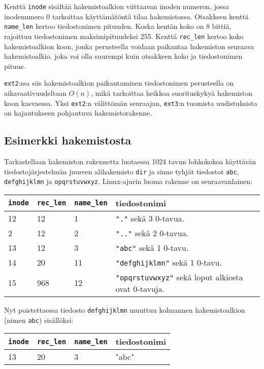 Kenttä \texttt{inode} sisältää hakemistoalkion viittaavan inoden numeron,
jossa inodenumero 0 tarkoittaa käyttämätöntä tilaa hakemistossa.
Otsakkeen kenttä \texttt{name\_len} kertoo tiedostonimen pituuden.
Koska kentän koko on 8 bittiä, rajoittuu tiedostonimen maksimipituudeksi 255.
Kenttä \texttt{rec\_len} kertoo koko hakemistoalkion koon,
jonka perusteella voidaan paikantaa hakemiston seuraava hakemistoalkio.
joka voi olla suurempi kuin otsakkeen koko ja tiedostonimen pituus.

\texttt{ext2}:ssa siis hakemistoalkion paikantaminen tiedostonimen perusteella on aikavaativuudeltaan $O(n)$,
mikä tarkoittaa heikkoa suorituskykyä hakemiston koon kasvaessa.
Yksi \texttt{ext2}:n välittömän seuraajan, \texttt{ext3}:n tuomista uudistuksista on hajautukseen pohjautuva hakemistorakenne.

\subsection{Esimerkki hakemistosta}
Tarkastellaan hakemiston rakennetta luotaessa 1024 tavun lohkokokoa käyttävän tiedostojärjestelmän juureen alihakemisto \texttt{dir} ja sinne tyhjät tiedostot \texttt{abc}, \texttt{defghijklmn} ja \texttt{opqrstuvwxyz}.
Linux-ajurin luoma rakenne on seuraavanlainen:

\begin{tabular}{llll}
    \texttt{inode} & \texttt{rec\_len} & \texttt{name\_len} & tiedostonimi \\ \hline
    12 & 12  & 1  & \texttt{"."}            sekä 3 0-tavua. \\
    2  & 12  & 2  & \texttt{".."}           sekä 2 0-tavua. \\
    13 & 12  & 3  & \texttt{"abc"}          sekä 1 0-tavu. \\
    14 & 20  & 11 & \texttt{"defghijklmn"}  sekä 1 0-tavu. \\
    15 & 968 & 12 & \texttt{"opqrstuvwxyz"} sekä loput alkiosta ovat 0-tavuja. \\
\end{tabular}

Nyt poistettaessa tiedosto \texttt{defghijklmn} muuttuu kolmannen hakemistoalkion (nimen \texttt{abc}) sisällöksi:

\begin{tabular}{llll}
    \texttt{inode} & \texttt{rec\_len} & \texttt{name\_len} & tiedostonimi \\ \hline
    13 & 20  & 3  & "abc"\\
\end{tabular}

